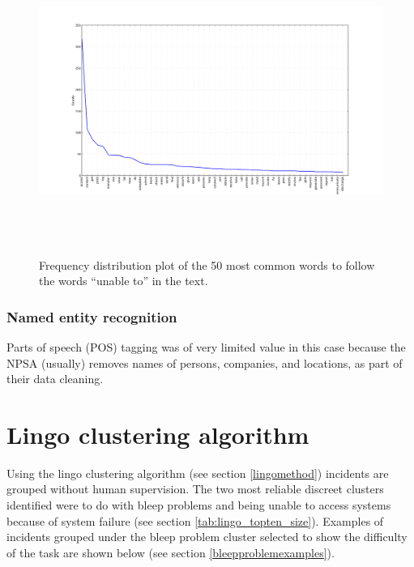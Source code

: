 \begin{figure}[htp]
\centering
\includegraphics[width=15cm,height=10cm]{figs/unableto.png}
\caption{Frequency distribution plot of the 50 most common words to follow the words ``unable to'' in the text.}\label{fig:unableto}
\end{figure}

\subsubsection{Named entity recognition}

Parts of speech (POS) tagging was of very limited value in this case because the NPSA (usually) removes names of persons, companies, and locations, as part of their data cleaning.


\section{Lingo clustering algorithm}
\label{lingoresults}
Using the lingo clustering algorithm (see section \ref{lingomethod}) incidents are grouped without human supervision. The two most reliable discreet clusters identified were to do with bleep problems and being unable to access systems because of system failure (see section \ref{tab:lingo_topten_size}). Examples of incidents grouped under the bleep problem cluster selected to show the difficulty of the task are shown below (see section \ref{bleepproblemexamples}).

